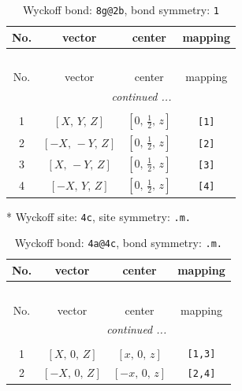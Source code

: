 \documentclass[fleqn,8pt]{jsarticle}
\begin{document}
\begin{longtable}{cccc}
\caption{Wyckoff bond: {\tt 8g@2b}, bond symmetry: {\tt 1}}
 \\
 \hline \hline
No. & vector & center & mapping \\ \hline \endfirsthead

\multicolumn{3}{l}{\tablename\ \thetable{}} \\
 \hline \hline
No. & vector & center & mapping \\ \hline \endhead

 \hline \hline
\multicolumn{3}{r}{\footnotesize\it continued ...} \\ \endfoot

 \hline \hline
\multicolumn{3}{r}{} \\ \endlastfoot

1 & $\left[ X,\, Y,\, Z \right]$ & $\left[ 0,\, \frac{1}{2},\, z \right]$ & {\tt [1]} \\ \hline
2 & $\left[ - X,\, - Y,\, Z \right]$ & $\left[ 0,\, \frac{1}{2},\, z \right]$ & {\tt [2]} \\ \hline
3 & $\left[ X,\, - Y,\, Z \right]$ & $\left[ 0,\, \frac{1}{2},\, z \right]$ & {\tt [3]} \\ \hline
4 & $\left[ - X,\, Y,\, Z \right]$ & $\left[ 0,\, \frac{1}{2},\, z \right]$ & {\tt [4]} \\
\end{longtable}
* Wyckoff site: {\tt 4c}, site symmetry: {\tt .m.}
\renewcommand{\arraystretch}{1.2}
\begin{longtable}{cccc}
\caption{Wyckoff bond: {\tt 4a@4c}, bond symmetry: {\tt .m.}}
 \\
 \hline \hline
No. & vector & center & mapping \\ \hline \endfirsthead

\multicolumn{3}{l}{\tablename\ \thetable{}} \\
 \hline \hline
No. & vector & center & mapping \\ \hline \endhead

 \hline \hline
\multicolumn{3}{r}{\footnotesize\it continued ...} \\ \endfoot

 \hline \hline
\multicolumn{3}{r}{} \\ \endlastfoot

1 & $\left[ X,\, 0,\, Z \right]$ & $\left[ x,\, 0,\, z \right]$ & {\tt [1,3]} \\ \hline
2 & $\left[ - X,\, 0,\, Z \right]$ & $\left[ - x,\, 0,\, z \right]$ & {\tt [2,4]} \\
\end{longtable}
\end{document}
